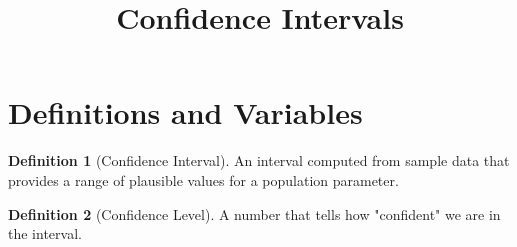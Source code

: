 \documentclass{article}
\title{Confidence Intervals}
\theoremstyle{definition}
\newtheorem{definition}{Definition}[section]
\theoremstyle{remark}
\begin{document}
\maketitle
\tableofcontents


\newcommand{\normaldist}{
\begin{tikzpicture}
\begin{axis}[
  no markers, 
  domain=0:6, 
  samples=100,
  ymin=0,
  axis lines*=left, 
  xlabel=$x$,
  every axis y label/.style={at=(current axis.above origin),anchor=south},
  every axis x label/.style={at=(current axis.right of origin),anchor=west},
  height=5cm, 
  width=12cm,
  xtick=\empty, 
  ytick=\empty,
  enlargelimits=false, 
  clip=false, 
  axis on top,
  grid = major,
  hide y axis
  ]

\addplot [very thick,cyan!50!black] {gauss(x, 3, 1)};

\pgfmathsetmacro\valueA{gauss(1,3,1)}
\pgfmathsetmacro\valueB{gauss(2,3,1)}
\draw [gray] (axis cs:1,0) -- (axis cs:1,\valueA)
    (axis cs:5,0) -- (axis cs:5,\valueA);
\draw [gray] (axis cs:2,0) -- (axis cs:2,\valueB)
    (axis cs:4,0) -- (axis cs:4,\valueB);
\draw [yshift=0.3cm, latex-latex](axis cs:1, 0) -- node [fill=white] {$0.95$} (axis cs:5, 0);

\node[below] at (axis cs:1, 0)  {$\mu - 2\sigma$}; 
\node[below] at (axis cs:2, 0)  {$\mu - \sigma$}; 
\node[below] at (axis cs:3, 0)  {$\mu$}; 
\node[below] at (axis cs:4, 0)  {$\mu + \sigma$}; 
\node[below] at (axis cs:5, 0)  {$\mu + 2\sigma$}; 

\end{axis}
\end{tikzpicture}
}

\section{Definitions and Variables}

\begin{definition}[Confidence Interval]
  An interval computed from sample data that provides a range of plausible values for a population parameter.
\end{definition}

\begin{definition}[Confidence Level]
  A number that tells how "confident" we are in the interval.
\end{definition}
\end{document}
